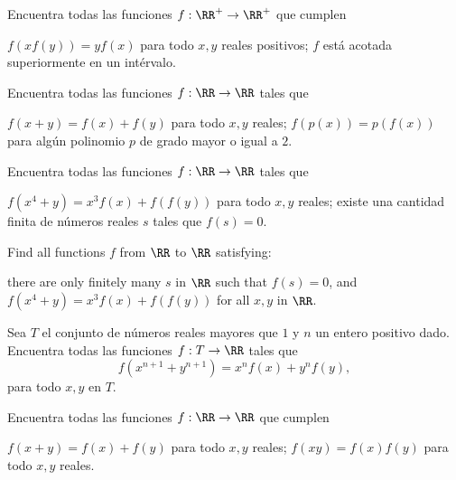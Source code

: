 \begin{problem}
  Encuentra todas las funciones $f:\RR^+\to\RR^+$ que cumplen
  \begin{enumerate}[(i)]
    \ii $f(xf(y))=yf(x)$ para todo $x,y$ reales positivos;
    \ii $f$ está acotada superiormente en un intérvalo.
  \end{enumerate}
\end{problem}

\begin{problem}
  Encuentra todas las funciones $f:\RR\to\RR$ tales que
  \begin{enumerate}[(i)]
    \ii $f(x+y)=f(x)+f(y)$ para todo $x,y$ reales;
    \ii $f(p(x))=p(f(x))$ para algún polinomio $p$ de grado mayor o igual a $2$.
  \end{enumerate}
\end{problem}

\begin{problem}[APMO 2002/5]
  Encuentra todas las funciones $f:\RR\to\RR$ tales que
  \begin{enumerate}[(i)]
    \ii $f(x^4+y)=x^3f(x)+f(f(y))$ para todo $x,y$ reales;
    \ii existe una cantidad finita de números reales $s$ tales que $f(s)=0$.
  \end{enumerate}
  \begin{hint}
    Find all functions $f$ from $\RR$ to $\RR$ satisfying:
    \begin{enumerate}[(i)]
      \ii there are only finitely many $s$ in $\RR$ such that $f(s)=0$, and
      \ii $f(x^4+y)=x^3f(x)+f(f(y))$ for all $x,y$ in $\RR$.
    \end{enumerate}
  \end{hint}
\end{problem}

\begin{problem}
  Sea $T$ el conjunto de números reales mayores que $1$ y $n$ un entero positivo
  dado. Encuentra todas las funciones $f:T\to\RR$ tales que
  \[f(x^{n+1}+y^{n+1})=x^nf(x)+y^nf(y),\]
  para todo $x,y$ en $T$.
\end{problem}

\begin{problem}
  Encuentra todas las funciones $f:\RR\to\RR$ que cumplen
  \begin{enumerate}[(i)]
    \ii $f(x+y)=f(x)+f(y)$ para todo $x,y$ reales;
    \ii $f(xy)=f(x)f(y)$ para todo $x,y$ reales.
  \end{enumerate}
\end{problem}


